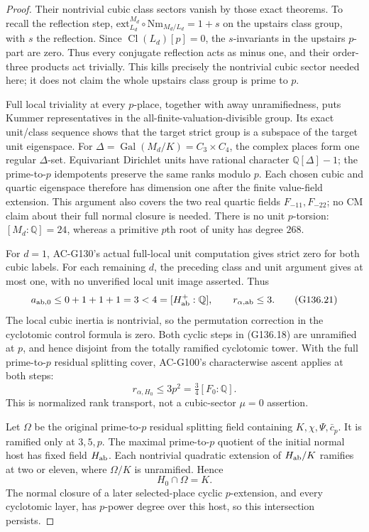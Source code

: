 \begin{proof}
Their nontrivial cubic class sectors vanish by those exact
theorems.  To recall the reflection step,
\(\mathrm{ext}_{L_d}^{M_d}\circ\mathrm{Nm}_{M_d/L_d}=1+s\)
on the upstairs class group, with \(s\) the
reflection.  Since \(\operatorname{Cl}(L_d)[p]=0\), the
\(s\)-invariants in the upstairs \(p\)-part are zero.
Thus every conjugate reflection acts as minus one, and their
order-three products act trivially.  This kills precisely
the nontrivial cubic sector needed here; it does not claim
the whole upstairs class group is prime to \(p\).

Full local triviality at every \(p\)-place, together with
away unramifiedness, puts Kummer representatives in the
all-finite-valuation-divisible group.  Its exact unit/class
sequence shows that the target strict group is a subspace
of the target unit eigenspace.  For
\(\Delta=\operatorname{Gal}(M_d/K)=C_3\times C_4\), the
complex places form one regular \(\Delta\)-set.  Equivariant
Dirichlet units have rational character
\(\mathbb Q[\Delta]-1\); the prime-to-\(p\) idempotents
preserve the same ranks modulo \(p\).  Each chosen cubic
and quartic eigenspace therefore has dimension one after
the finite value-field extension.  This argument also covers
the two real quartic fields \(F_{-11},F_{-22}\); no CM claim
about their full normal closure is needed.
There is no unit \(p\)-torsion: \([M_d:\mathbb Q]=24\),
whereas a primitive \(p\)th root of unity has degree \(268\).

For \(d=1\), AC-G130's actual full-local unit computation
gives strict zero for both cubic labels.  For each remaining
\(d\), the preceding class and unit argument gives at most
one, with no unverified local unit image asserted.  Thus
\[
 a_{{\rm ab},0}\le0+1+1+1=3<4=[H_{\rm ab}^+:\mathbb Q],
 \qquad r_{\alpha,{\rm ab}}\le3.
 \tag{G136.21}
\]
The local cubic inertia is nontrivial, so the permutation
correction in the cyclotomic control formula is zero.
Both cyclic steps in (G136.18) are unramified at \(p\),
and hence disjoint from the totally ramified cyclotomic
tower.  With the full prime-to-\(p\) residual splitting
cover, AC-G100's characterwise ascent applies at both steps:
\[
 r_{\alpha,H_0}\le3p^2=\tfrac34[F_0:\mathbb Q].
 \tag{G136.22}
\]
This is normalized rank transport, not a cubic-sector
\(\mu=0\) assertion.

Let \(\Omega\) be the original prime-to-\(p\) residual
splitting field containing \(K,\chi,\Psi,\bar c_p\).
It is ramified only at \(3,5,p\).
The maximal prime-to-\(p\) quotient of the initial normal
host has fixed field \(H_{\rm ab}\).  Each nontrivial
quadratic extension of \(H_{\rm ab}/K\) ramifies at two
or eleven, where \(\Omega/K\) is unramified.  Hence
\[
                         H_0\cap\Omega=K.
 \tag{G136.23}
\]
The normal closure of a later selected-place cyclic
\(p\)-extension, and every cyclotomic layer, has \(p\)-power
degree over this host, so this intersection persists.


\end{proof}
